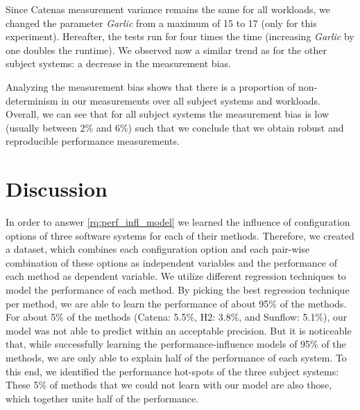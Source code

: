Since Catenas measurement variance remains the same for all workloads, we changed the parameter \textit{Garlic} from a maximum of 15 to 17 (only for this experiment). Hereafter, the tests run for four times the time (increasing \textit{Garlic} by one doubles the runtime). We observed now a similar trend as for the other subject systems: a decrease in the measurement bias.

Analyzing the measurement bias shows that there is a proportion of non-determinism in our measurements over all subject systems and workloads. Overall, we can see that for all subject systems the measurement bias is low (usually between 2\% and 6\%) such that we conclude that we obtain robust and reproducible performance measurements.



\clearpage

\section{Discussion}
\label{discussion}



In order to answer \ref{rq:perf_infl_model} we learned the influence of configuration options of three software systems for each of their methods. Therefore, we created a dataset, which combines each configuration option and each pair-wise combination of these options as independent variables and the performance of each method as dependent variable. We utilize different regression techniques to model the performance of each method. By picking the best regression technique per method, we are able to learn the performance of about 95\% of the methods. For about 5\% of the methods (Catena: 5.5\%, H2: 3.8\%, and Sunflow: 5.1\%), our model was not able to predict within an acceptable precision. 
But it is noticeable that, while successfully learning the performance-influence models of 95\% of the methods, we are only able to explain half of the performance of each system. To this end, we identified the performance hot-spots of the three subject systems: These 5\% of methods that we could not learn with our model are also those, which together unite half of the performance. 



